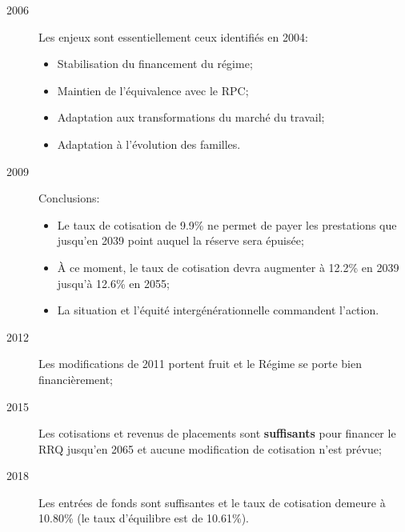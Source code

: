 \documentclass[10pt, french]{article}
\begin{document}
\begin{multicols*}{3}
\begin{rappel_enhanced}
\begin{description}
	\item[2006]	Les enjeux sont essentiellement ceux identifiés en 2004:
		\begin{itemize}[leftmargin = *]
		\item	Stabilisation du financement du régime;
		\item	Maintien de l'équivalence avec le RPC;
		\item	Adaptation aux transformations du marché du travail;
		\item	Adaptation à l'évolution des familles.
		\end{itemize}
	\item[2009]	Conclusions:
		\begin{itemize}[leftmargin = *]
		\item	Le taux de cotisation de 9.9\% ne permet de payer les prestations que jusqu'en 2039 point auquel la réserve sera épuisée;
		\item	À ce moment, le taux de cotisation devra augmenter à 12.2\% en 2039 jusqu'à 12.6\% en 2055;
		\item	La situation et l'équité intergénérationnelle commandent l'action.
		\end{itemize}
	\item[2012]	Les modifications de 2011 portent fruit et le Régime se porte bien financièrement;
	\item[2015]	Les cotisations et revenus de placements sont \textbf{suffisants} pour financer le RRQ jusqu'en 2065 et aucune modification de cotisation n’est prévue;
	\item[2018]	Les entrées de fonds sont suffisantes et le taux de cotisation demeure à 10.80\% (le taux d'équilibre est de 10.61\%).
\end{description}
\end{rappel_enhanced}


\end{multicols*}
\end{document}

